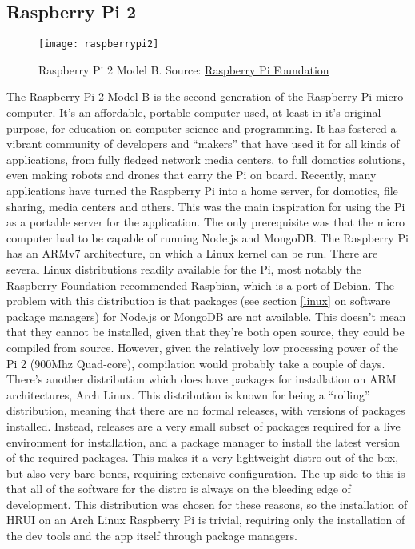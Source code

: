 \subsection{Raspberry Pi 2} \label{raspberrypi2}
\begin{figure}[H]
\centering
\texttt{[image: raspberrypi2]}
\caption{Raspberry Pi 2 Model B. Source: \href{https://raspberrypi.org/raspberry-pi-2-on-sale/}{Raspberry Pi Foundation}}
\end{figure}
The Raspberry Pi 2 Model B is the second generation of the Raspberry Pi micro computer. It's an affordable, portable computer used, at 
least in it's original purpose, for education on computer science and programming. It has fostered a vibrant community of developers and 
``makers'' that have used it for all kinds of applications, from fully fledged network media centers, to full domotics solutions, even 
making robots and drones that carry the Pi on board. Recently, many applications have turned the Raspberry Pi into a home server, for 
domotics, file sharing, media centers and others. This was the main inspiration for using the Pi as a portable server for the 
application. The only prerequisite was that the micro computer had to be capable of running Node.js and MongoDB. The Raspberry Pi has an 
ARMv7 architecture, on which a Linux kernel can be run. There are several Linux distributions readily available for the Pi, most notably 
the Raspberry Foundation recommended Raspbian, which is a port of Debian. The problem with this distribution is that packages (see 
section \ref{linux} on software package managers) for Node.js or MongoDB are not available. This doesn't mean that they cannot be 
installed, given that they're both open source, they could be compiled from source. However, given the relatively low processing power 
of the Pi 2 (900Mhz Quad-core), compilation would probably take a couple of days. There's another distribution which does have packages 
for installation on ARM architectures, Arch Linux. This distribution is known for being a ``rolling'' distribution, meaning that there 
are no formal releases, with versions of packages installed. Instead, releases are a very small subset of packages required for a live 
environment for installation, and a package manager to install the latest version of the required packages. This makes it a very 
lightweight distro out of the box, but also very bare bones, requiring extensive configuration. The up-side to this is that all of the 
software for the distro is always on the bleeding edge of development. This distribution was chosen for these reasons, so the 
installation of HRUI on an Arch Linux Raspberry Pi is trivial, requiring only the installation of the dev tools and the app itself 
through package managers.\\

